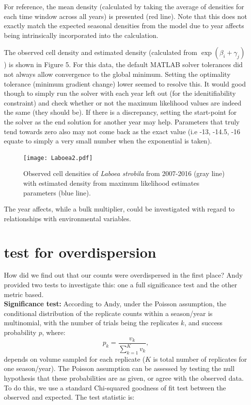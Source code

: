 \documentclass[11pt]{article}
\begin{document}
For reference, the mean density (calculated by taking the average of densities for each time window across all years) is presented (red line). Note that this does not exactly match the expected seasonal densities from the model due to year affects being intrinsically incorporated into the calculation.

The observed cell density and estimated density (calculated from $\exp(\beta_i+\gamma_j)$) is shown in Figure 5. For this data, the default MATLAB solver tolerances did not always allow convergence to the global minimum. Setting the optimality tolerance (minimum gradient change) lower seemed to resolve this. It would good though to simply run the solver with each year left out (for the idenitifiability constraint) and check whether or not the maximum likelihood values are indeed the same (they should be). If there is a discrepancy, setting the start-point for the solver as the end solution for another year may  help. Parameters that truly tend towards zero also may not come back as the exact value (i.e -13, -14.5, -16 equate to simply a very small number when the exponential is taken). 


\begin{figure}[h]
\centering
\texttt{[image: Laboea2.pdf]}
\caption{Observed cell densities of \textit{Laboea strobila} from 2007-2016 (gray line) with estimated density from maximum likelihood estimates parameters (blue line).}
\end{figure}

The year affects, while a bulk multiplier, could be investigated with regard to relationships with environmental variables. 

\clearpage

\section{test for overdispersion}        

How did we find out that our counts were overdispersed in the first place? Andy provided two tests to investigate this: one a full significance test and the other metric based.\\

\noindent \textbf{Significance test:} According to Andy, under the Poisson assumption, the conditional distribution of the replicate counts within a season/year is multinomial, with the number of trials being the replicates $k$, and success probability $p$, where:
\[
p_k = \frac{v_k}{\sum_{k=1}^K v_k},
\]
depends on volume sampled for each replicate ($K$ is total number of replicates for one season/year). The Poisson assumption can be assessed by testing the null hypothesis that these probabilities are as given, or agree with the observed data. To do this, we use a standard Chi-squared goodness of fit test between the observed and expected. The test statistic is:
\end{document}
